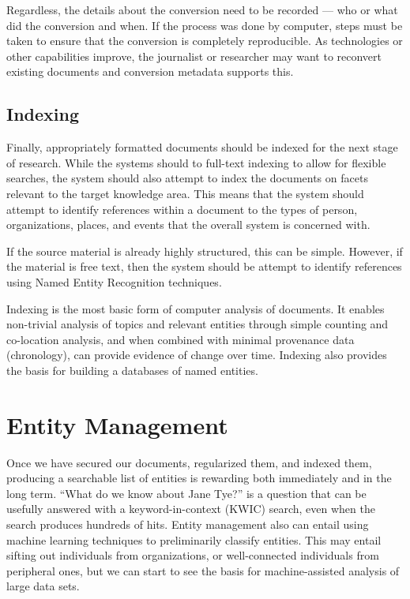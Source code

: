\documentclass[format=siggraph, review=true]{acmart}
\begin{document}
Regardless, the details about the conversion need to be recorded ---
who or what did the conversion and when. If the process was done by
computer, steps must be taken to ensure that the conversion is
completely reproducible. As technologies or other capabilities
improve, the journalist or researcher may want to reconvert existing
documents and conversion metadata supports this.

\subsection{Indexing}
Finally, appropriately formatted documents should be indexed for the
next stage of research. While the systems should to full-text indexing
to allow for flexible searches, the system should also attempt to
index the documents on facets relevant to the target knowledge
area. This means that the system should attempt to identify references
within a document to the types of person, organizations, places, and
events that the overall system is concerned with.

If the source material is already highly structured, this can be
simple. However, if the material is free text, then the system should
be attempt to identify references using Named Entity Recognition
techniques. 

Indexing is the most basic form of computer analysis of documents. It enables non-trivial analysis of topics and relevant entities through simple counting and co-location analysis, and when combined with minimal provenance data (chronology), can provide evidence of change over time. Indexing also provides the basis for building a databases of named entities.

\section{Entity Management}

Once we have secured our documents, regularized them, and indexed them, producing a searchable list of entities is rewarding both immediately and in the long term. ``What do we know about Jane Tye?'' is a question that can be usefully answered with a keyword-in-context (KWIC) search, even when the search produces hundreds of hits. Entity management also can entail using machine learning techniques to preliminarily classify entities. This may entail sifting out individuals from organizations, or well-connected individuals from peripheral ones, but we can start to see the basis for machine-assisted analysis of large data sets.
\end{document}
